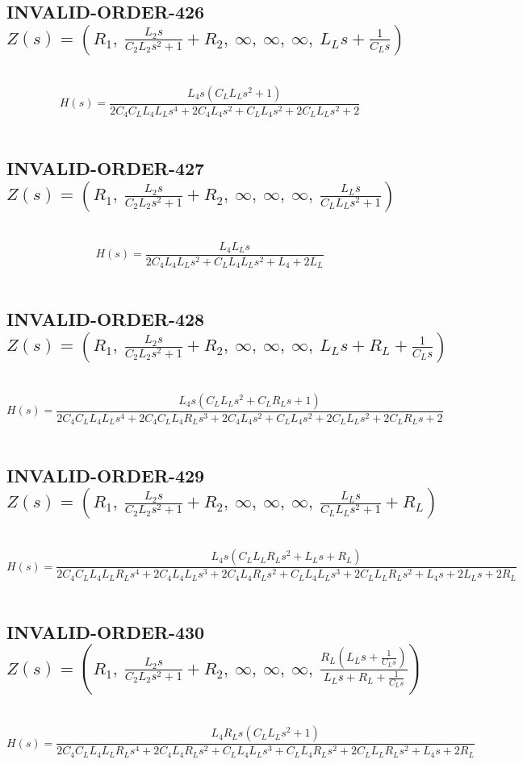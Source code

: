 \documentclass{article}
\begin{document}
\subsection{INVALID-ORDER-426 $Z(s) = \left( R_{1}, \  \frac{L_{2} s}{C_{2} L_{2} s^{2} + 1} + R_{2}, \  \infty, \  \infty, \  \infty, \  L_{L} s + \frac{1}{C_{L} s}\right)$ } \ 
\textbf{\[H(s) = \frac{L_{4} s \left(C_{L} L_{L} s^{2} + 1\right)}{2 C_{4} C_{L} L_{4} L_{L} s^{4} + 2 C_{4} L_{4} s^{2} + C_{L} L_{4} s^{2} + 2 C_{L} L_{L} s^{2} + 2}\] } \ 
\subsection{INVALID-ORDER-427 $Z(s) = \left( R_{1}, \  \frac{L_{2} s}{C_{2} L_{2} s^{2} + 1} + R_{2}, \  \infty, \  \infty, \  \infty, \  \frac{L_{L} s}{C_{L} L_{L} s^{2} + 1}\right)$ } \ 
\textbf{\[H(s) = \frac{L_{4} L_{L} s}{2 C_{4} L_{4} L_{L} s^{2} + C_{L} L_{4} L_{L} s^{2} + L_{4} + 2 L_{L}}\] } \ 
\subsection{INVALID-ORDER-428 $Z(s) = \left( R_{1}, \  \frac{L_{2} s}{C_{2} L_{2} s^{2} + 1} + R_{2}, \  \infty, \  \infty, \  \infty, \  L_{L} s + R_{L} + \frac{1}{C_{L} s}\right)$ } \ 
\textbf{\[H(s) = \frac{L_{4} s \left(C_{L} L_{L} s^{2} + C_{L} R_{L} s + 1\right)}{2 C_{4} C_{L} L_{4} L_{L} s^{4} + 2 C_{4} C_{L} L_{4} R_{L} s^{3} + 2 C_{4} L_{4} s^{2} + C_{L} L_{4} s^{2} + 2 C_{L} L_{L} s^{2} + 2 C_{L} R_{L} s + 2}\] } \ 
\subsection{INVALID-ORDER-429 $Z(s) = \left( R_{1}, \  \frac{L_{2} s}{C_{2} L_{2} s^{2} + 1} + R_{2}, \  \infty, \  \infty, \  \infty, \  \frac{L_{L} s}{C_{L} L_{L} s^{2} + 1} + R_{L}\right)$ } \ 
\textbf{\[H(s) = \frac{L_{4} s \left(C_{L} L_{L} R_{L} s^{2} + L_{L} s + R_{L}\right)}{2 C_{4} C_{L} L_{4} L_{L} R_{L} s^{4} + 2 C_{4} L_{4} L_{L} s^{3} + 2 C_{4} L_{4} R_{L} s^{2} + C_{L} L_{4} L_{L} s^{3} + 2 C_{L} L_{L} R_{L} s^{2} + L_{4} s + 2 L_{L} s + 2 R_{L}}\] } \ 
\subsection{INVALID-ORDER-430 $Z(s) = \left( R_{1}, \  \frac{L_{2} s}{C_{2} L_{2} s^{2} + 1} + R_{2}, \  \infty, \  \infty, \  \infty, \  \frac{R_{L} \left(L_{L} s + \frac{1}{C_{L} s}\right)}{L_{L} s + R_{L} + \frac{1}{C_{L} s}}\right)$ } \ 
\textbf{\[H(s) = \frac{L_{4} R_{L} s \left(C_{L} L_{L} s^{2} + 1\right)}{2 C_{4} C_{L} L_{4} L_{L} R_{L} s^{4} + 2 C_{4} L_{4} R_{L} s^{2} + C_{L} L_{4} L_{L} s^{3} + C_{L} L_{4} R_{L} s^{2} + 2 C_{L} L_{L} R_{L} s^{2} + L_{4} s + 2 R_{L}}\] } \ 
\end{document}
